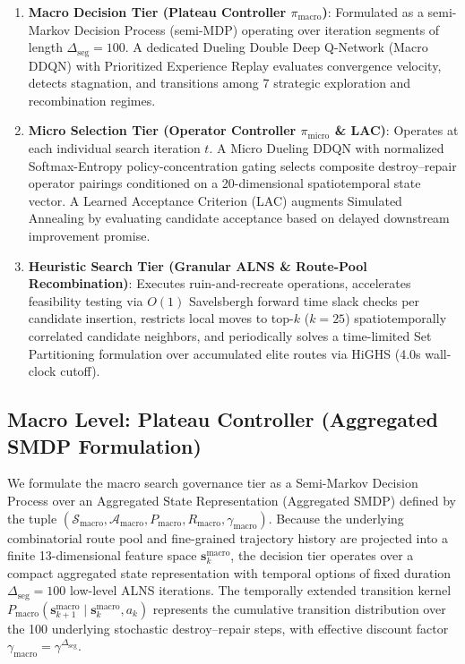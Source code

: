 \documentclass{ieeeaccess}
\begin{document}
\begin{enumerate}
    \item \textbf{Macro Decision Tier (Plateau Controller $\pi_{\text{macro}}$)}: Formulated as a semi-Markov Decision Process (semi-MDP) operating over iteration segments of length $\Delta_{\text{seg}} = 100$. A dedicated Dueling Double Deep Q-Network (Macro DDQN)\cite{mnih2015human,vanhasselt2016deep} with Prioritized Experience Replay\cite{schaul2016prioritized} evaluates convergence velocity, detects stagnation, and transitions among 7 strategic exploration and recombination regimes.
    \item \textbf{Micro Selection Tier (Operator Controller $\pi_{\text{micro}}$ \& LAC)}: Operates at each individual search iteration $t$. A Micro Dueling DDQN with normalized Softmax-Entropy policy-concentration gating selects composite destroy--repair operator pairings conditioned on a 20-dimensional spatiotemporal state vector. A Learned Acceptance Criterion (LAC) augments Simulated Annealing by evaluating candidate acceptance based on delayed downstream improvement promise.
    \item \textbf{Heuristic Search Tier (Granular ALNS \& Route-Pool Recombination)}: Executes ruin-and-recreate operations, accelerates feasibility testing via $O(1)$ Savelsbergh forward time slack checks per candidate insertion, restricts local moves to top-$k$ ($k=25$) spatiotemporally correlated candidate neighbors, and periodically solves a time-limited Set Partitioning formulation over accumulated elite routes via HiGHS (4.0s wall-clock cutoff).
\end{enumerate}


\subsection{Macro Level: Plateau Controller (Aggregated SMDP Formulation)}
\label{sec:macro_controller}

We formulate the macro search governance tier as a Semi-Markov Decision Process\cite{sutton1999between} over an Aggregated State Representation (Aggregated SMDP) defined by the tuple $(\mathcal{S}_{\text{macro}}, \mathcal{A}_{\text{macro}}, P_{\text{macro}}, R_{\text{macro}}, \gamma_{\text{macro}})$. Because the underlying combinatorial route pool and fine-grained trajectory history are projected into a finite 13-dimensional feature space $\mathbf{s}_k^{\text{macro}}$, the decision tier operates over a compact aggregated state representation with temporal options of fixed duration $\Delta_{\text{seg}} = 100$ low-level ALNS iterations. The temporally extended transition kernel $P_{\text{macro}}(\mathbf{s}_{k+1}^{\text{macro}} \mid \mathbf{s}_k^{\text{macro}}, a_k)$ represents the cumulative transition distribution over the 100 underlying stochastic destroy--repair steps, with effective discount factor $\gamma_{\text{macro}} = \gamma^{\Delta_{\text{seg}}}$.
\end{document}
